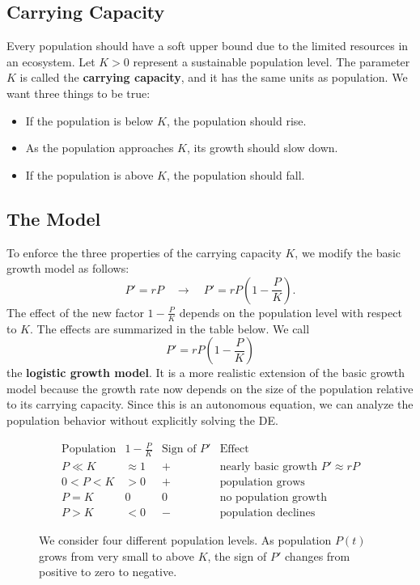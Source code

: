 \documentclass[09pt,letterpaper]{article}
\begin{document}
\subsection{Carrying Capacity}

Every population should have a soft upper bound due to the limited resources
in an ecosystem. Let $K>0$ represent a sustainable population level. The
parameter $K$ is called the \textbf{carrying capacity}, and it has the same
units as population. We want three things to be true:
\begin{itemize}
    \item If the population is below $K$, the population should rise.
    \item As the population approaches $K$, its growth should slow down.
    \item If the population is above $K$, the population should fall.
\end{itemize}

\subsection{The Model}
To enforce the three properties of the carrying capacity $K$, we modify the basic growth model as follows:
$$
P' =rP \quad \rightarrow \quad P' = rP\left(1-\frac{P}{K}\right).
$$
The effect of the new factor  $1-\tfrac{P}{K}$ depends on the population level with respect to $K.$ The effects are summarized in the table below. 
We call
\[
P'=rP\left(1-\frac{P}{K}\right)
\]
the \textbf{logistic growth model}. It is a more realistic extension of the
basic growth model because the growth rate now depends on the size of the
population relative to its carrying capacity. Since this is an autonomous equation, we can analyze the population behavior
without explicitly solving the DE.
\begin{figure}
    \centering
\[
\begin{array}{c|c|c|c}
\text{Population} & 1-\frac{P}{K} & \text{Sign of }P' & \text{Effect}\\
\hline
P\ll K & \approx 1 & + & \text{nearly basic growth }P'\approx rP \\[4pt]
0<P<K  & >0 &+& \text{population grows}\\[4pt]
P=K & 0 & 0 & \text{no population growth}\\[4pt]
P>K & <0 & - & \text{population declines}
\end{array}
\]
\caption{We consider four different population levels. As population $P(t)$ grows from very small to above $K$, the sign of $P'$ changes from positive to zero to negative.}
\end{figure}
\end{document}
